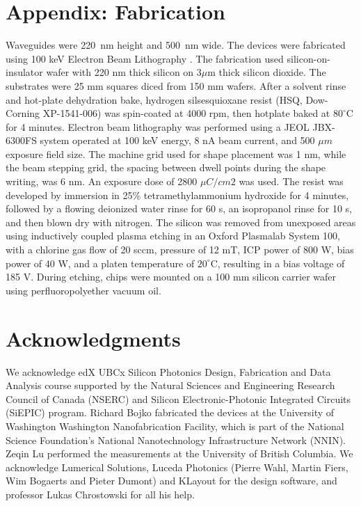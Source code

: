 \documentclass[10pt]{article}
\begin{document}
\section*{Appendix: Fabrication}
\label{sec:appendix}
Waveguides were 220~nm height and 500~nm wide. The devices were fabricated using 100 keV Electron Beam Lithography \cite{Bojko2011}. The fabrication used silicon-on-insulator wafer with 220 nm thick silicon on 3$\mu$m thick silicon dioxide. The substrates were 25 mm squares diced from 150 mm wafers. After a solvent rinse and hot-plate dehydration bake, hydrogen silsesquioxane resist (HSQ, Dow-Corning XP-1541-006) was spin-coated at 4000 rpm, then hotplate baked at $80^\circ$C for 4 minutes. Electron beam lithography was performed using a JEOL JBX-6300FS system operated at 100 keV energy, 8 nA beam current, and 500 $\mu m$ exposure field size. The machine grid used for shape placement was 1 nm, while the beam stepping grid, the spacing between dwell points during the shape writing, was 6 nm. An exposure dose of 2800 $\mu C/cm2$ was used. The resist was developed by immersion in 25\% tetramethylammonium hydroxide for 4 minutes, followed by a flowing deionized water rinse for 60 s, an isopropanol rinse for 10 s, and then blown dry with nitrogen. The silicon was removed from unexposed areas using inductively coupled plasma etching in an Oxford Plasmalab System 100, with a chlorine gas flow of 20 sccm, pressure of 12 mT, ICP power of 800 W, bias power of 40 W, and a platen temperature of $20^\circ$C, resulting in a bias voltage of 185 V. During etching, chips were mounted on a 100 mm silicon carrier wafer using perfluoropolyether vacuum oil. 


\section*{Acknowledgments}
We acknowledge edX UBCx Silicon Photonics Design, Fabrication and Data Analysis course supported by the Natural Sciences and Engineering Research Council of Canada (NSERC) and Silicon Electronic-Photonic Integrated Circuits (SiEPIC) program.
Richard Bojko fabricated the devices at the University of Washington Washington Nanofabrication Facility, which is part of the National Science Foundation's National Nanotechnology Infrastructure Network (NNIN).
Zeqin Lu performed the measurements at the University of British Columbia.
We acknowledge Lumerical Solutions, Luceda Photonics (Pierre Wahl, Martin Fiers, Wim Bogaerts and Pieter Dumont) and KLayout for the design software, and professor Lukas Chrostowski for all his help.
\end{document}
